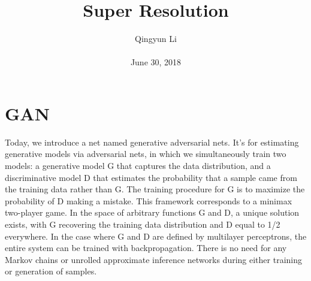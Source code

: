 \documentclass[10pt,twocolumn,letterpaper]{article}
\begin{document}
\author{Qingyun Li\\\\
June 30, 2018}        
\title{Super Resolution}

\maketitle

\section{GAN}
\par Today, we introduce a net named generative adversarial nets. It's for estimating generative models via adversarial nets, in which we simultaneously train two models: a generative model G that captures the data distribution, and a discriminative model D that estimates the probability that a sample came from the training data rather than G. The training procedure for G is to maximize the probability of D making a mistake. This framework corresponds to a minimax two-player game. In the space of arbitrary functions G and D, a unique solution exists, with G recovering the training data distribution and D equal to 1/2 everywhere. In the case where G and D are defined by multilayer perceptrons, the entire system can be trained with backpropagation. There is no need for any Markov chains or unrolled approximate inference networks during either training or generation of samples.
\end{document}
